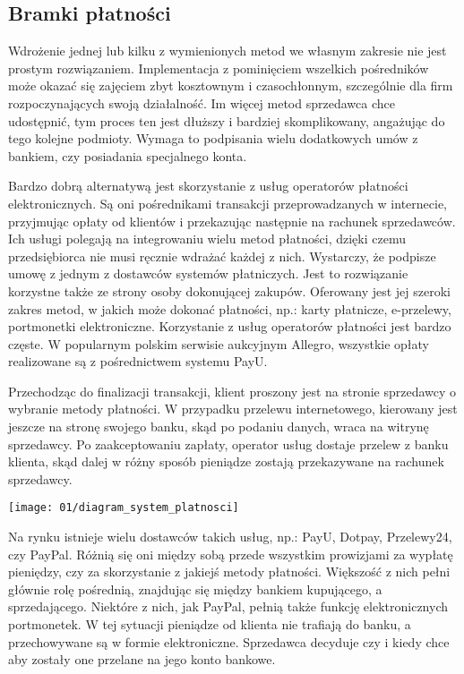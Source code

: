 \subsection{Bramki płatności}
Wdrożenie jednej lub kilku z wymienionych metod we własnym zakresie nie jest prostym rozwiązaniem. Implementacja z pominięciem wszelkich pośredników może okazać się zajęciem zbyt kosztownym i czasochłonnym, szczególnie dla firm rozpoczynających swoją działalność. Im więcej metod sprzedawca chce udostępnić, tym proces ten jest dłuższy i bardziej skomplikowany, angażując do tego kolejne podmioty. Wymaga to podpisania wielu dodatkowych umów z bankiem, czy posiadania specjalnego konta. 

Bardzo dobrą alternatywą jest skorzystanie z usług operatorów płatności elektronicznych. Są oni pośrednikami transakcji przeprowadzanych w internecie, przyjmując opłaty od klientów i przekazując następnie na rachunek sprzedawców. Ich usługi polegają na integrowaniu wielu metod płatności, dzięki czemu przedsiębiorca nie musi ręcznie wdrażać każdej z nich. Wystarczy, że podpisze umowę z jednym z dostawców systemów płatniczych. Jest to rozwiązanie korzystne także ze strony osoby dokonującej zakupów. Oferowany jest jej szeroki zakres metod, w jakich może dokonać płatności, np.: karty płatnicze, e-przelewy, portmonetki elektroniczne. Korzystanie z usług operatorów płatności jest bardzo częste. W popularnym polskim serwisie aukcyjnym Allegro, wszystkie opłaty realizowane są z pośrednictwem systemu PayU.

Przechodząc do finalizacji transakcji, klient proszony jest na stronie sprzedawcy o wybranie metody płatności. W przypadku przelewu internetowego, kierowany jest jeszcze na stronę swojego banku, skąd po podaniu danych, wraca na witrynę sprzedawcy. Po zaakceptowaniu zapłaty, operator usług dostaje przelew z banku klienta, skąd dalej w różny sposób pieniądze zostają przekazywane na rachunek sprzedawcy.
\begin{center}
	\texttt{[image: 01/diagram\_system\_platnosci]}
\end{center}
Na rynku istnieje wielu dostawców takich usług, np.: PayU, Dotpay, Przelewy24, czy PayPal. Różnią się oni między sobą przede wszystkim prowizjami za wypłatę pieniędzy, czy za skorzystanie z jakiejś metody płatności. Większość z nich pełni głównie rolę pośrednią, znajdując się między bankiem kupującego, a sprzedającego. Niektóre z nich, jak PayPal, pełnią także funkcję elektronicznych portmonetek. W tej sytuacji pieniądze od klienta nie trafiają do banku, a przechowywane są w formie elektroniczne. Sprzedawca decyduje czy i kiedy chce aby zostały one przelane na jego konto bankowe. 